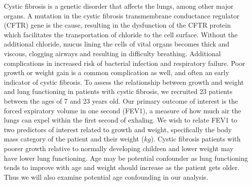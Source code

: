 \documentclass{article}
\begin{document}
		Cystic fibrosis is a genetic disorder that affects the lungs, among other major organs. A mutation in the cystic fibrosis transmembrane conductance regulator (CFTR) gene is the cause, resulting in the dysfunction of the CFTR protein which facilitates the transportation of chloride to the cell surface. Without the additional chloride, mucus lining the cells of vital organs becomes thick and viscous, clogging airways and resulting in difficulty breathing. Additional complications in increased risk of bacterial infection and respiratory failure. Poor growth or weight gain is a common complication as well, and often an early indicator of cystic fibrosis. To assess the relationship between growth and weight and lung functioning in patients with cystic fibrosis, we recruited 23 patients between the ages of 7 and 23 years old. Our primary outcome of interest is the forced expiratory volume in one second (FEV1), a measure of how much air the lungs can expel within the first second of exhaling. We wish to relate FEV1 to two predictors of interest related to growth and weight, specifically the body mass category of the patient and their weight ($kg$). Cystic fibrosis patients with poorer growth relative to normally developing children and lower weight may have lower lung functioning. Age may be potential confounder as lung functioning tends to improve with age and weight should increase as the patient gets older. Thus we will also examine potential age confounding in our analysis.
		
\end{document}
